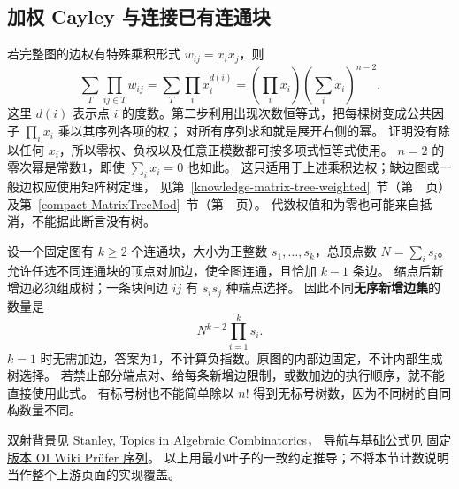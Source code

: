 \clearpage
\subsection{加权 Cayley 与连接已有连通块}
若完整图的边权有特殊乘积形式 $w_{ij}=x_i x_j$，则
\[
 \sum_T\prod_{ij\in T}w_{ij}
 =\sum_T\prod_i x_i^{d(i)}
 =\left(\prod_i x_i\right)\left(\sum_i x_i\right)^{n-2}.
\]
这里 $d(i)$ 表示点 $i$ 的度数。第二步利用出现次数恒等式，把每棵树变成公共因子 $\prod_i x_i$ 乘以其序列各项的权；
对所有序列求和就是展开右侧的幂。
证明没有除以任何 $x_i$，所以零权、负权以及任意正模数都可按多项式恒等式使用。
$n=2$ 的零次幂是常数1，即使 $\sum_i x_i=0$ 也如此。
这只适用于上述乘积边权；缺边图或一般边权应使用矩阵树定理，
见第~\ref{knowledge-matrix-tree-weighted}~节（第~\pageref{knowledge-matrix-tree-weighted}~页）及第~\ref{compact-MatrixTreeMod}~节（第~\pageref{compact-MatrixTreeMod}~页）。
代数权值和为零也可能来自抵消，不能据此断言没有树。

设一个固定图有 $k\ge2$ 个连通块，大小为正整数 $s_1,\ldots,s_k$，总顶点数 $N=\sum_i s_i$。
允许任选不同连通块的顶点对加边，使全图连通，且恰加 $k-1$ 条边。
缩点后新增边必须组成树；一条块间边 $ij$ 有 $s_i s_j$ 种端点选择。
因此不同\textbf{无序新增边集}的数量是
\[
 N^{k-2}\prod_{i=1}^k s_i.
\]
$k=1$ 时无需加边，答案为1，不计算负指数。原图的内部边固定，不计内部生成树选择。
若禁止部分端点对、给每条新增边限制，或数加边的执行顺序，就不能直接使用此式。
有标号树也不能简单除以 $n!$ 得到无标号树数，因为不同树的自同构数量不同。

双射背景见
\href{https://math.mit.edu/~rstan/algcomb/algcomb.pdf}{Stanley, Topics in Algebraic Combinatorics}，
导航与基础公式见
\href{https://github.com/OI-wiki/OI-wiki/blob/bc070e827180fbd75c2e27a16c1212f1d671d949/docs/graph/prufer.md}{固定版本 OI Wiki Prüfer 序列}。
以上用最小叶子的一致约定推导；不将本节计数说明当作整个上游页面的实现覆盖。
